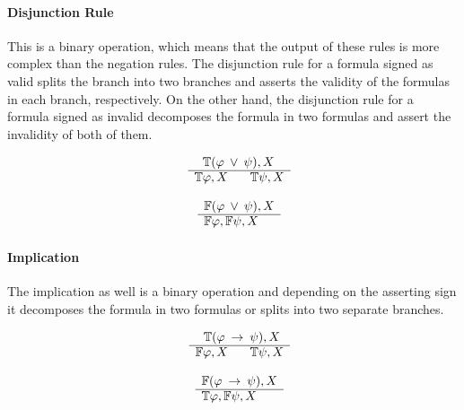 \documentclass{article}
\newcommand{\signT}{\mathbb{T}}
\newcommand{\signF}{\mathbb{F}}
\begin{document}
		\paragraph{Disjunction Rule}
This is a binary operation, which means that the output of these rules is more complex than the negation rules.
The disjunction rule for a formula signed as valid splits the branch into two branches and asserts the validity of the formulas in each branch, respectively.
On the other hand, the disjunction rule for a formula signed as invalid decomposes the formula in two formulas and assert the invalidity of both of them.
		\newline
		\noindent\begin{minipage}{.5\linewidth}
		\begin{align*}
			\begin{array}{rl}
				& \:\:\: \signT(\varphi \: \vee \: \psi), X \\
			      \cline{2-2}
			      & \signT\varphi, X \:\:\:\:\:\:\:\: \signT\psi, X
			\end{array}
		\end{align*}
		\end{minipage}%
		\begin{minipage}{.5\linewidth}
		\begin{align*}
			\begin{array}{rl}
				& \signF(\varphi \: \vee \: \psi), X \\
			      \cline{2-2}
			      & \signF\varphi, \signF\psi, X
			\end{array}
		\end{align*}
		\end{minipage}
		
		\paragraph{Implication}
The implication as well is a binary operation and depending on the asserting sign it decomposes the formula in two formulas or splits into two separate branches.
		\newline
		\noindent\begin{minipage}{.5\linewidth}
		\begin{align*}
			\begin{array}{rl}
				& \:\:\: \signT(\varphi \: \rightarrow \: \psi), X \\
			      \cline{2-2}
			      & \signF\varphi, X \:\:\:\:\:\:\:\: \signT\psi, X
			\end{array}
		\end{align*}
		\end{minipage}%
		\begin{minipage}{.5\linewidth}
		\begin{align*}
			\begin{array}{rl}
				& \signF(\varphi \: \rightarrow \: \psi), X \\
			      \cline{2-2}
			      & \signT\varphi, \signF\psi, X
			\end{array}
		\end{align*}
		\end{minipage}
		
\end{document}
